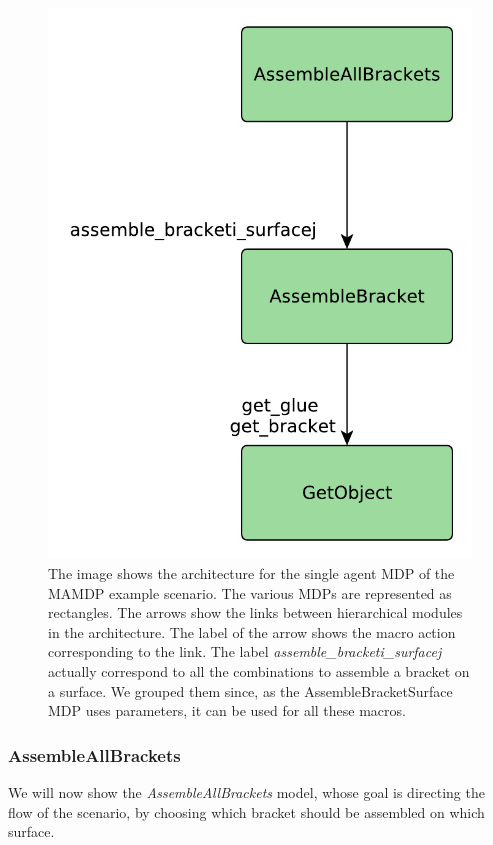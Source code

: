 \begin{figure}[ht!]
	\centering
	\includegraphics[scale=0.5]{img/coworker/mamdp/scenario_single_architecture.pdf}
	\caption[MAMDP example single MDP]{The image shows the architecture for the single agent MDP of the MAMDP example scenario. The various MDPs are represented as rectangles. The arrows show the links between hierarchical modules in the architecture. The label of the arrow shows the macro action corresponding to the link. The label \textit{assemble\_bracketi\_surfacej} actually correspond to all the combinations to assemble a bracket on a surface. We grouped them since, as the AssembleBracketSurface MDP uses parameters, it can be used for all these macros.}
	\label{fig:mamdp-scenario_single_architecture}
\end{figure}



\subsubsection{AssembleAllBrackets}
We will now show the \textit{AssembleAllBrackets} model, whose goal is directing the flow of the scenario, by choosing which bracket should be assembled on which surface.

